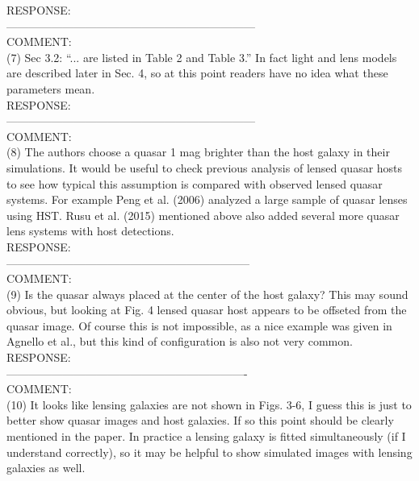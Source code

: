 \documentclass[a4paper,11pt]{article}
\begin{document}
RESPONSE:
\\

------------------------------------------------------------------
\\
COMMENT:
\\
(7) Sec 3.2: “... are listed in Table 2 and Table 3.” In fact light and lens models are described later in Sec. 4, so at this point readers have no idea what these parameters mean.
\\

RESPONSE:
\\

------------------------------------------------------------------
\\
COMMENT:
\\
(8) The authors choose a quasar 1 mag brighter than the host galaxy in their simulations. It would be useful to check previous analysis of lensed quasar hosts to see how typical this assumption is compared with observed lensed quasar systems. For example Peng et al. (2006) analyzed a large sample of quasar lenses using HST. Rusu et al. (2015) mentioned above also added several more quasar lens systems with host detections.
\\

RESPONSE:
\\

-----------------------------------------------------------------
\\
COMMENT:
\\
(9) Is the quasar always placed at the center of the host galaxy? This may sound obvious, but looking at Fig. 4 lensed quasar host appears to be offseted from the quasar image. Of course this is not impossible, as a nice example was given in Agnello et al., but this kind of configuration is also not very common.
\\

RESPONSE:
\\

----------------------------------------------------------------
\\
COMMENT:
\\
(10) It looks like lensing galaxies are not shown in Figs. 3-6, I guess this is just to better show quasar images and host galaxies. If so this point should be clearly mentioned in the paper. In practice a lensing galaxy is fitted simultaneously (if I understand correctly), so it may be helpful to show simulated images with lensing galaxies as well.
\\
\end{document}

